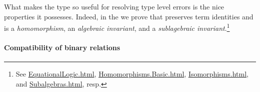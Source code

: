 \begin{code}
\end{code}
\ccpad
What makes the  type so useful for resolving type level errors is the nice properties it possesses. Indeed, in the \ualib we prove that  preserves term identities and is a \emph{homomorphism}, an \emph{algebraic invariant}, and a \emph{sublagebraic invariant}.\footnote{%
See \href{https://ualib.gitlab.io/Varieties.EquationalLogic.html\#lift-invariance}{EquationalLogic.html}, \href{https://ualib.gitlab.io/Homomorphisms.Basic.html\#exmples-of-homomorphisms}{Homomorphisms.Basic.html}, \href{https://ualib.gitlab.io/Homomorphisms.Isomorphisms.html\#lift-is-an-algebraic-invariant}{Isomorphisms.html}, and \href{https://ualib.gitlab.io/Subalgebras.Subalgebras.html\#lifts-of-subalgebras}{Subalgebras.html}, resp.}






\paragraph*{Compatibility of binary relations}\label{compatibility-of-binary-relations}

